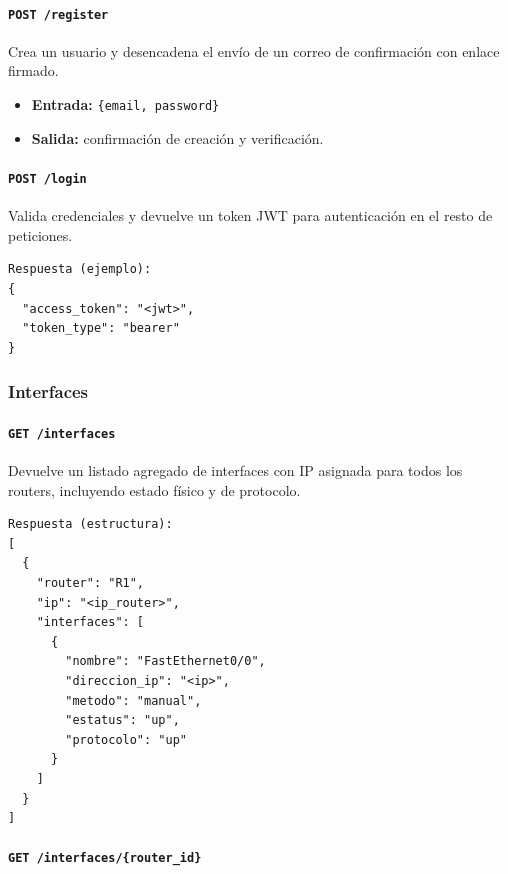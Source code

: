 \paragraph*{\texttt{POST /register}}
\vspace*{1cm}

Crea un usuario y desencadena el envío de un correo de confirmación con enlace firmado.
\begin{itemize}
    \item \textbf{Entrada:} \texttt{\{email, password\}}
    \item \textbf{Salida:} confirmación de creación y verificación.
\end{itemize}

\paragraph*{\texttt{POST /login}}
\vspace*{1cm}

Valida credenciales y devuelve un token JWT para autenticación en el resto de peticiones.
\begin{verbatim}
Respuesta (ejemplo):
{
  "access_token": "<jwt>",
  "token_type": "bearer"
}
\end{verbatim}

\subsubsection*{Interfaces}

\paragraph*{\texttt{GET /interfaces}}
\vspace*{1cm}

Devuelve un listado agregado de interfaces con IP asignada para todos los routers, incluyendo estado físico y de protocolo.
\begin{verbatim}
Respuesta (estructura):
[
  {
    "router": "R1",
    "ip": "<ip_router>",
    "interfaces": [
      {
        "nombre": "FastEthernet0/0",
        "direccion_ip": "<ip>",
        "metodo": "manual",
        "estatus": "up",
        "protocolo": "up"
      }
    ]
  }
]
\end{verbatim}

\paragraph*{\texttt{GET /interfaces/\{router\_id\}}}
\vspace*{1cm}

